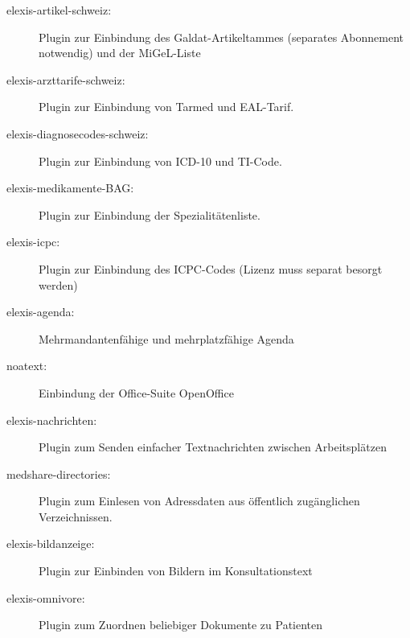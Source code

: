 \begin{description}
  \item [elexis-artikel-schweiz:] Plugin zur Einbindung des Galdat-Artikeltammes (separates Abonnement notwendig) und der MiGeL-Liste

  \item[elexis-arzttarife-schweiz:] Plugin zur Einbindung von Tarmed und EAL-Tarif.

  \item[elexis-diagnosecodes-schweiz:] Plugin zur Einbindung von ICD-10 und TI-Code.

  \item[elexis-medikamente-BAG:] Plugin zur Einbindung der Spezialitätenliste.

  \item[elexis-icpc:] Plugin zur Einbindung des ICPC-Codes (Lizenz muss separat besorgt werden)

  \item[elexis-agenda:] Mehrmandantenfähige und mehrplatzfähige Agenda

  \item[noatext:] Einbindung der Office-Suite OpenOffice

  \item[elexis-nachrichten:] Plugin zum Senden einfacher Textnachrichten zwischen Arbeitsplätzen
  \item[medshare-directories:] Plugin zum Einlesen von Adressdaten aus öffentlich zugänglichen Verzeichnissen.
  \item[elexis-bildanzeige:] Plugin zur Einbinden von Bildern im Konsultationstext
  \item[elexis-omnivore:] Plugin zum Zuordnen beliebiger Dokumente zu Patienten


\end{description} 